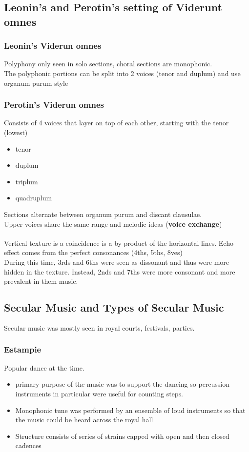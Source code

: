 \documentclass{article}
\begin{document}
  \subsection{Leonin's and Perotin's setting of Viderunt omnes}
  \subsubsection{Leonin's Viderun omnes}
  Polyphony only seen in solo sections, choral sections are monophonic. \\
  The polyphonic portions can be split into 2 voices (tenor and duplum) and use organum purum style
  \subsubsection{Perotin's Viderun omnes}
  Consists of 4 voices that layer on top of each other, starting with the tenor (lowest)
  \begin{itemize}
    \item tenor
    \item duplum
    \item triplum
    \item quadruplum
  \end{itemize}
  Sections alternate between organum purum and discant clausulae. \\
  Upper voices share the same range and melodic ideas (\textbf{voice exchange}) \\ \\
  Vertical texture is a coincidence is a by product of the horizontal lines. Echo effect comes from the perfect consonances (4ths, 5ths, 8ves) \\
  During this time, 3rds and 6ths were seen as dissonant and thus were more hidden in the texture. Instead, 2nds and 7ths were more consonant and more prevalent in them music.
  \subsection{Secular Music and Types of Secular Music}
  Secular music was mostly seen in royal courts, festivals, parties.
  \subsubsection{Estampie}
  Popular dance at the time.
  \begin{itemize}
    \item primary purpose of the music was to support the dancing so percussion instruments in particular were useful for counting steps.
    \item Monophonic tune was performed by an ensemble of loud instruments so that the music could be heard across the royal hall
    \item Structure consists of series of strains capped with open and then closed cadences
  \end{itemize}
\end{document}
